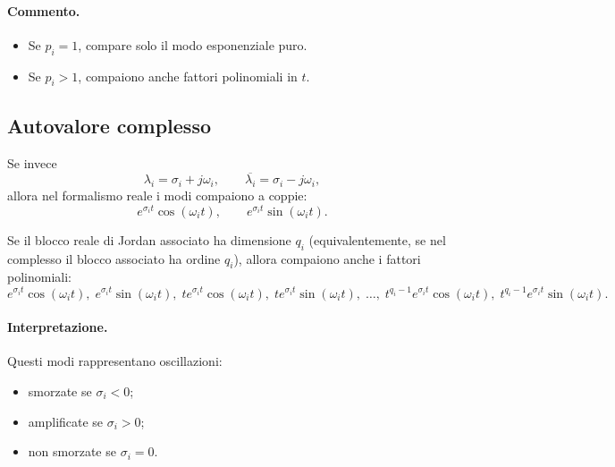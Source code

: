 \paragraph{Commento.}
\begin{itemize}
    \item Se $p_i=1$, compare solo il modo esponenziale puro.
    \item Se $p_i>1$, compaiono anche fattori polinomiali in $t$.
\end{itemize}

\subsection{Autovalore complesso}

Se invece
\[
\lambda_i = \sigma_i + j\omega_i,
\qquad
\overline{\lambda_i} = \sigma_i - j\omega_i,
\]
allora nel formalismo reale i modi compaiono a coppie:
\begin{equation}
e^{\sigma_i t}\cos(\omega_i t),
\qquad
e^{\sigma_i t}\sin(\omega_i t).
\label{eq:L9_modes_complex_CT_base}
\end{equation}

Se il blocco reale di Jordan associato ha dimensione $q_i$ (equivalentemente, se nel complesso il blocco associato ha ordine $q_i$), allora compaiono anche i fattori polinomiali:
\begin{equation}
e^{\sigma_i t}\cos(\omega_i t),\;
e^{\sigma_i t}\sin(\omega_i t),\;
t e^{\sigma_i t}\cos(\omega_i t),\;
t e^{\sigma_i t}\sin(\omega_i t),\;
\dots,\;
t^{q_i-1} e^{\sigma_i t}\cos(\omega_i t),\;
t^{q_i-1} e^{\sigma_i t}\sin(\omega_i t).
\label{eq:L9_modes_complex_CT}
\end{equation}

\paragraph{Interpretazione.}
Questi modi rappresentano oscillazioni:
\begin{itemize}
    \item smorzate se $\sigma_i<0$;
    \item amplificate se $\sigma_i>0$;
    \item non smorzate se $\sigma_i=0$.
\end{itemize}

